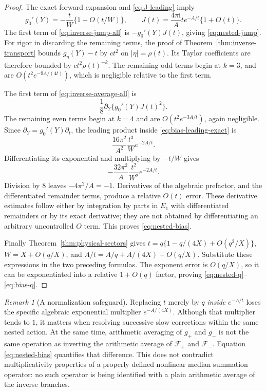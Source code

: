 \documentclass[11pt,a4paper]{article}
\numberwithin{equation}{section}
\theoremstyle{definition}\newtheorem{definition}[theorem]{Definition}
\theoremstyle{remark}\newtheorem{remark}[theorem]{Remark}
\newcommand{\ii}{\mathrm i}
\newcommand{\F}{\mathcal F}\newcommand{\CC}{\mathcal C}
\begin{document}
\begin{proof}
The exact forward expansion and \eqref{eq:J-leading} imply
\begin{equation}\label{eq:derivatives-leading}
 g_0'(Y)=-\frac{t}{W}\{1+O(t/W)\},\qquad
 J(t)=\frac{4\pi\ii}{A}t e^{-A/t}\{1+O(t)\}.
\end{equation}
The first term of \eqref{eq:inverse-jump-all} is
$-g_0'(Y)J(t)$, giving \eqref{eq:nested-jump}.
For rigor in discarding the remaining terms, the proof of
Theorem~\ref{thm:inverse-transport} bounds $g_\eta(Y)-t$ by
$ct^2$ on $|\eta|=\rho(t)$. Its Taylor coefficients are therefore
bounded by $ct^2\rho(t)^{-k}$. The remaining odd terms begin at
$k=3$, and are $O(t^2e^{-9A/(4t)})$, which is negligible relative
to the first term.

The first term of \eqref{eq:inverse-average-all} is
\begin{equation}\label{eq:bias-leading-exact}
 \frac18\partial_Y\{g_0'(Y)J(t)^2\}.
\end{equation}
The remaining even terms begin at $k=4$ and are
$O(t^2e^{-3A/t})$, again negligible. Since
$\partial_Y=g_0'(Y)\partial_t$, the leading product inside
\eqref{eq:bias-leading-exact} is
\[
 \frac{16\pi^2}{A^2}\frac{t^3}{W}e^{-2A/t}.
\]
Differentiating its exponential and multiplying by $-t/W$ gives
\[
 -\frac{32\pi^2}{A}\frac{t^2}{W^2}e^{-2A/t}.
\]
Division by $8$ leaves $-4\pi^2/A=-1$. Derivatives of the
algebraic prefactor, and the differentiated remainder terms, produce a
relative $O(t)$ error. These derivative estimates follow either by
integration by parts in $E_1$ with differentiated remainders or by its
exact derivative; they are not obtained by differentiating an arbitrary
uncontrolled $O$ term. This proves \eqref{eq:nested-bias}.

Finally Theorem~\ref{thm:physical-sectors} gives
$t=q\{1-q/(4X)+O(q^2/X)\}$, $W=X+O(q/X)$, and
$A/t=A/q+A/(4X)+O(q/X)$. Substitute these expressions in the
two preceding formulas. The exponent error is $O(q/X)$, so it can
be exponentiated into a relative $1+O(q)$ factor, proving
\eqref{eq:nested-q}--\eqref{eq:bias-q}.
\end{proof}

\begin{remark}[A normalization safeguard]
Replacing $t$ merely by $q$ \emph{inside} $e^{-A/t}$ loses the
specific algebraic exponential multiplier $e^{-A/(4X)}$.
Although that multiplier tends to $1$, it matters when resolving
successive slow corrections within the same nested action.
At the same time, arithmetic averaging of $g_+$ and $g_-$ is not the
same operation as inverting the arithmetic average of $\F_+$ and
$\F_-$. Equation \eqref{eq:nested-bias} quantifies that difference.
This does not contradict multiplicativity properties of a properly
defined nonlinear median summation operator: no such operator is being
identified with a plain arithmetic average of the inverse branches.
\end{remark}
\end{document}
